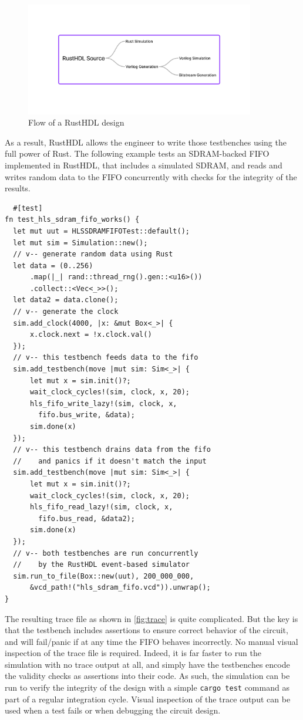 \documentclass[conference]{IEEEtran}
\begin{document}
\begin{figure}[htbp]
  \centerline{\includegraphics[width=10cm]{flow.png}}
  \caption{Flow of a RustHDL design}
  \label{fig:flow}
\end{figure}


As a result, RustHDL allows the engineer to write those testbenches using 
the full power of Rust.  The following example tests an SDRAM-backed FIFO implemented in RustHDL, that
includes a simulated SDRAM, and reads and writes random data to the FIFO concurrently with checks for
the integrity of the results.

\begin{verbatim}
  #[test]
fn test_hls_sdram_fifo_works() {
  let mut uut = HLSSDRAMFIFOTest::default();
  let mut sim = Simulation::new();
  // v-- generate random data using Rust
  let data = (0..256)
      .map(|_| rand::thread_rng().gen::<u16>())
      .collect::<Vec<_>>();
  let data2 = data.clone();
  // v-- generate the clock
  sim.add_clock(4000, |x: &mut Box<_>| {
      x.clock.next = !x.clock.val()
  });
  // v-- this testbench feeds data to the fifo
  sim.add_testbench(move |mut sim: Sim<_>| {
      let mut x = sim.init()?;
      wait_clock_cycles!(sim, clock, x, 20);
      hls_fifo_write_lazy!(sim, clock, x, 
        fifo.bus_write, &data);
      sim.done(x)
  });
  // v-- this testbench drains data from the fifo
  //    and panics if it doesn't match the input
  sim.add_testbench(move |mut sim: Sim<_>| {
      let mut x = sim.init()?;
      wait_clock_cycles!(sim, clock, x, 20);
      hls_fifo_read_lazy!(sim, clock, x, 
        fifo.bus_read, &data2);
      sim.done(x)
  });
  // v-- both testbenches are run concurrently
  //    by the RustHDL event-based simulator
  sim.run_to_file(Box::new(uut), 200_000_000, 
      &vcd_path!("hls_sdram_fifo.vcd")).unwrap();
}
\end{verbatim}

The resulting trace file as shown in \ref{fig:trace} is quite complicated.  But the key is that
the testbench includes assertions to ensure correct behavior of the circuit, and will fail/panic 
if at any time the FIFO behaves incorrectly.  No manual visual inspection of the trace file is
required.  Indeed, it is far faster to run the simulation with no trace output at all, and simply 
have the testbenches encode the validity checks as assertions into their code. As such, the 
simulation can be run to verify the integrity of the design with a simple \verb|cargo test| command 
as part of a regular integration cycle.  Visual inspection of the trace output can be used when 
a test fails or when debugging the circuit design.
\end{document}
